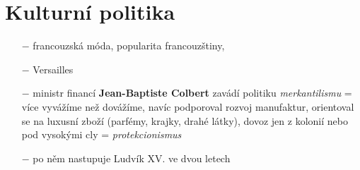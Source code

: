\documentclass{article}
\begin{document}
\section*{Kulturní politika}
\begin{itemize}
    \vspace{-0.5em}
    \setlength\itemsep{0.15em}
    \item[$-$] francouzská móda, popularita francouzštiny, 
    \item[$-$] Versailles
    \item[$-$] ministr financí \textbf{Jean-Baptiste Colbert} zavádí politiku \textit{merkantilismu} = více vyvážíme než dovážíme, navíc podporoval rozvoj manufaktur, orientoval se na luxusní zboží (parfémy, krajky, drahé látky), dovoz jen z kolonií nebo pod vysokými cly = \textit{protekcionismus}
\end{itemize}

\begin{itemize}
    \vspace{-0.5em}
    \setlength\itemsep{0.15em}
    \item[$-$] po něm nastupuje Ludvík XV. ve dvou letech
\end{itemize}
\end{document}
